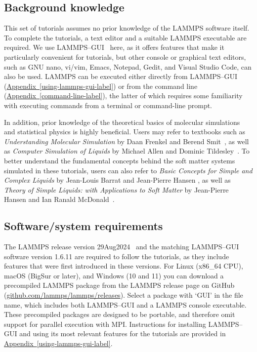 \documentclass[9pt,tutorial]{livecoms}
\begin{document}
\subsection{Background knowledge}

This set of tutorials assumes no prior knowledge of the LAMMPS software
itself.  To complete the tutorials, a text editor and a suitable LAMMPS
executable are required.  We use LAMMPS--GUI~\cite{lammps_gui_docs}
here, as it offers features that make it particularly convenient for
tutorials, but other console or graphical text editors, such as GNU nano,
vi/vim, Emacs, Notepad, Gedit, and Visual Studio Code, can also be
used.  LAMMPS can be executed either directly from
LAMMPS--GUI (\hyperref[using-lammps-gui-label]{Appendix~\ref{using-lammps-gui-label}})
or from the command line (\hyperref[command-line-label]{Appendix~\ref{command-line-label}}),
the latter of which requires some familiarity with executing commands
from a terminal or command-line prompt.

In addition, prior knowledge of the theoretical basics of molecular
simulations and statistical physics is highly beneficial.  Users may
refer to textbooks such as \textit{Understanding Molecular Simulation} by
Daan Frenkel and Berend Smit~\cite{frenkel2023understanding}, as well as
\textit{Computer Simulation of Liquids} by Michael Allen and Dominic
Tildesley~\cite{allen2017computer}.  To better understand
the fundamental concepts behind the soft matter systems simulated in these
tutorials, users can also refer to \textit{Basic Concepts for Simple and
  Complex Liquids} by Jean-Louis Barrat and Jean-Pierre Hansen
\cite{barrat2003basic}, as well as \textit{Theory of Simple Liquids:
  with Applications to Soft Matter} by Jean-Pierre Hansen and Ian Ranald
McDonald~\cite{hansen2013theory}.

\subsection{Software/system requirements}

The LAMMPS release version 29Aug2024~\cite{lammps_code} and the
matching LAMMPS--GUI software version 1.6.11 are required to follow the
tutorials, as they include features that were first introduced in these versions.
For Linux (x86\_64 CPU), macOS (BigSur or later), and Windows (10
and 11) you can download a precompiled LAMMPS package from the LAMMPS
release page on GitHub
(\href{https://github.com/lammps/lammps/releases}{github.com/lammps/lammps/releases}).
Select a package with `GUI' in the file name, which includes
both LAMMPS--GUI and a LAMMPS console executable.  These
precompiled packages are designed to be portable, and therefore omit support for
parallel execution with MPI.  Instructions for installing LAMMPS--GUI and
using its most relevant features for the tutorials are provided in 
\hyperref[using-lammps-gui-label]{Appendix~\ref{using-lammps-gui-label}}.
\end{document}
